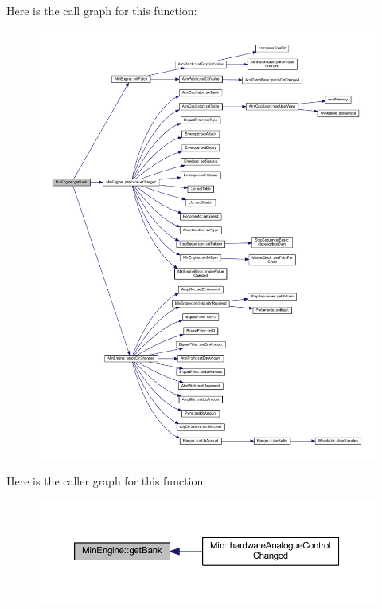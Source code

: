 Here is the call graph for this function\+:
\nopagebreak
\begin{figure}[H]
\begin{center}
\leavevmode
\includegraphics[width=350pt]{class_min_engine_ae9224dca462d7a6233fb7c22210cc8a8_cgraph}
\end{center}
\end{figure}
Here is the caller graph for this function\+:
\nopagebreak
\begin{figure}[H]
\begin{center}
\leavevmode
\includegraphics[width=350pt]{class_min_engine_ae9224dca462d7a6233fb7c22210cc8a8_icgraph}
\end{center}
\end{figure}
\mbox{\label{class_min_engine_a36831a348bb8157f2cc3a4720d92434e}} 
